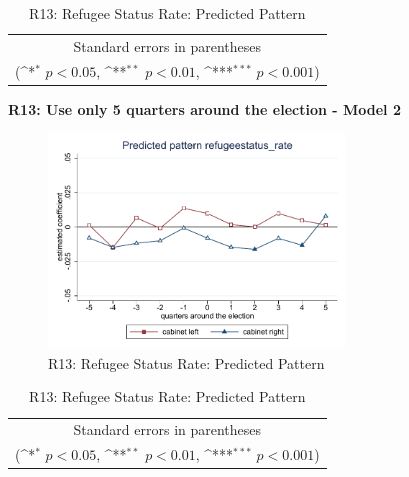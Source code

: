 \documentclass[10pt,a4paper]{scrartcl}
\begin{document}
\begin{table}[!ht]\centering
	\renewcommand{\arraystretch}{1.25}
	\def\sym#1{\ifmmode^{#1}\else\(^{#1}\)\fi}
	\caption{R13: Refugee Status Rate: Predicted Pattern}
	\begin{tabular}{l*{2}{c}}
		\hline\hline
		
		\hline\hline
		\multicolumn{3}{c}{\footnotesize Standard errors in parentheses} \\
		\multicolumn{3}{c}{\footnotesize (\sym{*} \(p<0.05\), \sym{**} \(p<0.01\), \sym{***} \(p<0.001\))}\\
	\end{tabular}
\end{table}

\clearpage
\textbf{R13: Use only 5 quarters around the election - Model 2}
\begin{figure}[!ht]
	\centering
	\includegraphics[width=0.7\textwidth]{figures_edited/refugeestatus_rate_graph2_R13.pdf}
	\caption{R13: Refugee Status Rate: Predicted Pattern}
\end{figure}

\begin{table}[!ht]\centering
	\footnotesize
	\renewcommand{\arraystretch}{1.2}
	\def\sym#1{\ifmmode^{#1}\else\(^{#1}\)\fi}
	\caption{R13: Refugee Status Rate: Predicted Pattern}
	\begin{tabular}{l*{2}{c}}
		\hline\hline
		
		\hline\hline
		\multicolumn{3}{c}{\footnotesize Standard errors in parentheses} \\
		\multicolumn{3}{c}{\footnotesize (\sym{*} \(p<0.05\), \sym{**} \(p<0.01\), \sym{***} \(p<0.001\))} \\
	\end{tabular}
\end{table}
\end{document}
